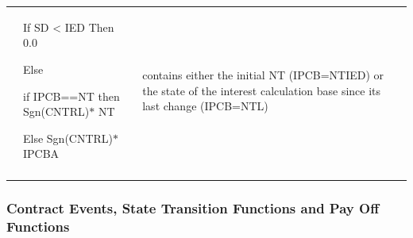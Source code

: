 \documentclass[9pt,oneside]{amsart}
\begin{document}
\begin{table}[H]
\begin{tabular}{p{0.48in}p{2.79in}p{2.63in}}
\hhline{---}
\multicolumn{1}{|p{0.48in}}{\textbf{Icb}} & 
\multicolumn{1}{|p{2.79in}}{If SD < IED Then 0.0 \par Else \par if IPCB==NT then Sgn(CNTRL)$\ast$ NT \par Else Sgn(CNTRL)$\ast$ IPCBA \par } & 
\multicolumn{1}{|p{2.63in}|}{contains either the initial NT (IPCB=NTIED) or the state of the interest calculation base since its last change (IPCB=NTL) \par } \\
\hhline{---}

\end{tabular}
 \end{table}




\vspace{\baselineskip}
\subsubsection{Contract Events, State Transition Functions and Pay Off Functions}


\end{document}

